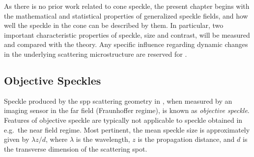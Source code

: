 As there is no prior work related to cone speckle, the present chapter begins
with the mathematical and statistical properties of generalized speckle
fields, and how well the speckle in the cone can be described by them.  In
particular, two important characteristic properties of speckle, size
and contrast, will be measured and compared with the theory.  Any specific
influence regarding dynamic changes in the underlying scattering
microstructure are reserved for .

\subsection{Objective Speckles}
Speckle produced by the \gls{spp} scattering geometry in
, when measured by an imaging sensor in the far
field (Fraunhoffer regime), is known as \textit{objective speckle}.  Features
of objective speckle are typically not applicable to speckle obtained in e.g.\
the near field regime.  Most pertinent, the mean speckle size is approximately
given by $\lambda z/d$, where $\lambda$ is the wavelength, $z$ is the
propagation distance, and $d$ is the transverse dimension of the scattering
spot\cite{dainty1975laser}.
